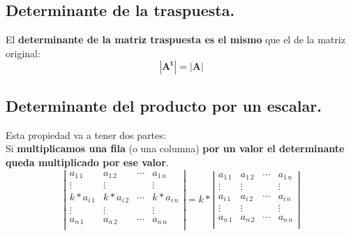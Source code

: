 \documentclass[a4paper,11pt,answers]{exam}
\begin{document}
\subsection{Determinante de la traspuesta.}
El \textbf{determinante de la matriz traspuesta es el mismo} que el de la matriz original:
\[\boldsymbol{|A^t| = |A|}\]

\subsection{Determinante del producto por un escalar.}
Esta propiedad va a tener dos partes:\\

Si \textbf{multiplicamos una fila }(o una columna) \textbf{por un valor el determinante queda multiplicado por ese valor}.
\[\left|\begin{array}{cccc}
a_{1\,1}&a_{1\,2}&\cdots&a_{1\,n}\\
\vdots&\vdots&&\vdots\\
k*a_{i\,1}&k*a_{i\,2}&\cdots&k*a_{i\,n}\\
\vdots&\vdots&&\vdots\\
a_{n\,1}&a_{n\,2}&\cdots&a_{n\,n}\\
\end{array}\right| = k*\left|\begin{array}{cccc}
a_{1\,1}&a_{1\,2}&\cdots&a_{1\,n}\\
\vdots&\vdots&&\vdots\\
a_{i\,1}&a_{i\,2}&\cdots&a_{i\,n}\\
\vdots&\vdots&&\vdots\\
a_{n\,1}&a_{n\,2}&\cdots&a_{n\,n}\\
\end{array}\right|\]
\end{document}
